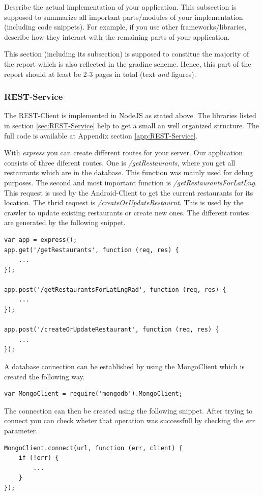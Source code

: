 Describe the actual implementation of your application. This subsection is
supposed to summarize all important parts/modules of your implementation
(including code snippets). For example, if you use other frameworks/libraries,
describe how they interact with the remaining parts of your application.

This section (including its subsection) is supposed to constitue the majority
of the report which is also reflected in the gradine scheme. Hence, this part of
the report should at least be 2-3 pages in total (text \emph{and} figures).

\subsubsection{REST-Service}
The REST-Client is implemented in NodeJS as stated above. The libraries listed in section \ref{sec:REST-Service} help to get a small an well organized structure. The full code is available at Appendix section \ref{app:REST-Service}.

With \textit{express} you can create different routes for your server. Our application consists of three diferent routes. One is \textit{/getRestaurants}, where you get all restaurants which are in the database. This function was mainly used for debug purposes. The second and most important function is \textit{/getRestaurantsForLatLng}. This request is used by the Android-Client to get the current restaurants for its location. The thrid request is \textit{/createOrUpdateRestaurnt}. This is used by the crawler to update existing restaurants or create new ones. The different routes are generated by the following snippet.
\begin{lstlisting}
var app = express();
app.get('/getRestaurants', function (req, res) {
	...
});

app.post('/getRestaurantsForLatLngRad', function (req, res) {
	...
});

app.post('/createOrUpdateRestaurant', function (req, res) {
	...
});
\end{lstlisting}

A database connection can be established by using the MongoClient which is created the following way.
\begin{lstlisting}
var MongoClient = require('mongodb').MongoClient;
\end{lstlisting} 

The connection can then be created using the following snippet. After trying to connect you can check wheter that operation was successfull by checking the \textit{err} parameter.
\begin{lstlisting}
MongoClient.connect(url, function (err, client) {
	if (!err) {
		...
	}
});
\end{lstlisting}

